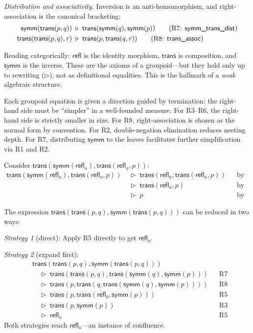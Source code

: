 \documentclass[manuscript]{BSLstyle}
\newcommand{\refl}{\mathsf{refl}}
\newcommand{\symm}{\mathsf{symm}}
\newcommand{\trans}{\mathsf{trans}}
\begin{document}
\emph{Distribution and associativity.} Inversion is an anti-homomorphism,
and right-association is the canonical bracketing:
\begin{align}
\symm(\trans(p, q)) &\;\triangleright\; \trans(\symm(q), \symm(p))
  \tag{R7: \textsf{symm\_trans\_dist}} \\
\trans(\trans(p, q), r) &\;\triangleright\; \trans(p, \trans(q, r))
  \tag{R8: \textsf{trans\_assoc}}
\end{align}

Reading categorically: $\refl$ is the identity morphism, $\trans$ is
composition, and $\symm$ is the inverse.  These are the axioms of a
groupoid---but they hold only up to rewriting ($\triangleright$), not
as definitional equalities.  This is the hallmark of a \emph{weak}
algebraic structure.

\begin{remark}[Directedness]
Each groupoid equation is given a direction guided by termination:
the right-hand side must be ``simpler'' in a well-founded measure.
For R3--R6, the right-hand side is strictly smaller in size.
For R8, right-association is chosen as the normal form by convention.
For R2, double-negation elimination reduces nesting depth.
For R7, distributing $\symm$ to the leaves facilitates further
simplification via R1 and R2.
\end{remark}

\begin{example}\label{ex:groupoid-reduction}
Consider $\trans(\symm(\refl_a), \trans(\refl_a, p))$:
\begin{align*}
\trans(\symm(\refl_a), \trans(\refl_a, p))
&\;\triangleright\; \trans(\refl_a, \trans(\refl_a, p))
  && \text{by R1} \\
&\;\triangleright\; \trans(\refl_a, p)
  && \text{by R3} \\
&\;\triangleright\; p
  && \text{by R3}
\end{align*}
\end{example}

\begin{example}\label{ex:inverse-cancel}
The expression $\trans(\trans(p, q), \symm(\trans(p, q)))$ can be reduced
in two ways:

\emph{Strategy 1} (direct): Apply R5 directly to get $\refl_a$.

\emph{Strategy 2} (expand first):
\begin{align*}
&\trans(\trans(p, q), \symm(\trans(p, q))) \\
&\quad\triangleright\; \trans(\trans(p, q), \trans(\symm(q), \symm(p)))
  && \text{R7} \\
&\quad\triangleright\; \trans(p, \trans(q, \trans(\symm(q), \symm(p))))
  && \text{R8} \\
&\quad\triangleright\; \trans(p, \trans(\refl_b, \symm(p)))
  && \text{R5} \\
&\quad\triangleright\; \trans(p, \symm(p))
  && \text{R3} \\
&\quad\triangleright\; \refl_a
  && \text{R5}
\end{align*}
Both strategies reach $\refl_a$---an instance of confluence.
\end{example}
\end{document}
